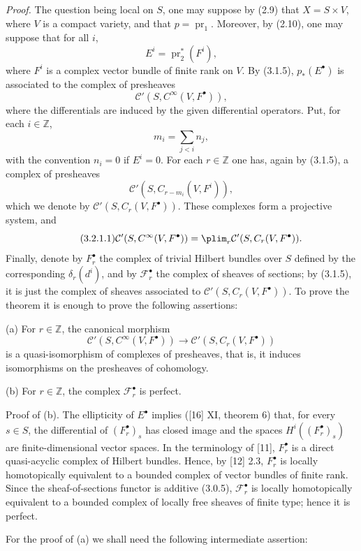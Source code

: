 \documentclass[11pt]{article}
\begin{document}
\emph{Proof.} The question being local on $S$, one may suppose by (2.9) that $X=S\times V$, where $V$ is a compact variety, and that $p=\operatorname{pr}_1$. Moreover, by (2.10), one may suppose that for all $i$,
\[
 E^i=\operatorname{pr}_2^*(F^i),
\]
where $F^i$ is a complex vector bundle of finite rank on $V$. By (3.1.5), $p_*(E^\bullet)$ is associated to the complex of presheaves
\[
 \mathcal C'(S,C^\infty(V,F^\bullet)),
\]
where the differentials are induced by the given differential operators. Put, for each $i\in\mathbb Z$,
\[
 m_i=\sum_{j<i}n_j,
\]
with the convention $n_i=0$ if $E^i=0$. For each $r\in\mathbb Z$ one has, again by (3.1.5), a complex of presheaves
\[
 \mathcal C'(S,C_{r-m_i}(V,F^i)),
\]
which we denote by $\mathcal C'(S,C_r(V,F^\bullet))$. These complexes form a projective system, and
\begin{equation}\tag{3.2.1.1}
 \mathcal C'(S,C^\infty(V,F^\bullet))
 =\plim_r \mathcal C'(S,C_r(V,F^\bullet)).
\end{equation}
Finally, denote by $F_r^\bullet$ the complex of trivial Hilbert bundles over $S$ defined by the corresponding $\delta_r(d^i)$, and by $\mathcal F_r^\bullet$ the complex of sheaves of sections; by (3.1.5), it is just the complex of sheaves associated to $\mathcal C'(S,C_r(V,F^\bullet))$. To prove the theorem it is enough to prove the following assertions:

(a) For $r\in\mathbb Z$, the canonical morphism
\[
 \mathcal C'(S,C^\infty(V,F^\bullet))\longrightarrow \mathcal C'(S,C_r(V,F^\bullet))
\]
is a quasi-isomorphism of complexes of presheaves, that is, it induces isomorphisms on the presheaves of cohomology.

(b) For $r\in\mathbb Z$, the complex $\mathcal F_r^\bullet$ is perfect.

Proof of (b). The ellipticity of $E^\bullet$ implies ([16] XI, theorem 6) that, for every $s\in S$, the differential of $(F_r^\bullet)_s$ has closed image and the spaces $H^i((F_r^\bullet)_s)$ are finite-dimensional vector spaces. In the terminology of [11], $F_r^\bullet$ is a direct quasi-acyclic complex of Hilbert bundles. Hence, by [12] 2.3, $F_r^\bullet$ is locally homotopically equivalent to a bounded complex of vector bundles of finite rank. Since the sheaf-of-sections functor is additive (3.0.5), $\mathcal F_r^\bullet$ is locally homotopically equivalent to a bounded complex of locally free sheaves of finite type; hence it is perfect.

For the proof of (a) we shall need the following intermediate assertion:
\end{document}
